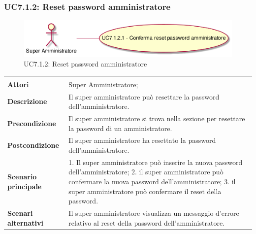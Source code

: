 \subsubsection{UC7.1.2: Reset password amministratore}
\label{UC7.1.2}\newpage
\begin{figure}[h]
\centering
\includegraphics[width=\textwidth,height=\textheight,keepaspectratio]{images/UseCaseUC7.1.2.png}
\caption{UC7.1.2: Reset password amministratore}
\end{figure}
\begin{longtable}{l|p{10cm}}
\hline
&\\
\textbf{Attori} & Super Amministratore;\\[7pt]
\textbf{Descrizione} & Il super amministratore può resettare la password dell'amministratore.\\[7pt]
\textbf{Precondizione} & Il super amministratore si trova nella sezione per resettare la password di un amministratore.\\[7pt]
\textbf{Postcondizione} & Il super amministratore ha resettato la password dell'amministratore.\\[7pt]
\textbf{Scenario principale} & 1. Il super amministratore può inserire la nuova password dell'amministratore;
2. il super amministratore può confermare la nuova password dell'amministratore;
3. il super amministratore può confermare il reset della password.\\[7pt]
\textbf{Scenari alternativi} & Il super amministratore visualizza un messaggio d'errore relativo al reset della password dell'amministratore.\\[7pt]\hline
\end{longtable}

